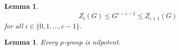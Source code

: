 \documentclass{dcthesis}
\newcommand{\defi}[1]{\textsf{#1}}
\numberwithin{equation}{section}
\newtheorem{lemma}[equation]{Lemma}
\theoremstyle{definition}
\newtheorem{definition}[equation]{Definition}
\theoremstyle{remark}
\begin{document}
{{{\begin{lemma}
      \[
        Z_i(G)\leq G^{c-i-1}\leq Z_{i+1}(G)
      \]
      for all $i\in \{0,1,\dots,c-1\}$.
    \end{lemma}
    \begin{lemma}
      \label{lem:pgroupsarenilpotent}
      Every $p$-group is nilpotent.
    \end{lemma}
  }
}}
\end{document}
